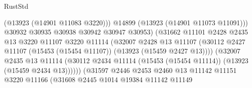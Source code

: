 \begin{lexlean}{RustStd}
\begin{coremodule}
                                              (@13923 (@14901 @11083 @3220)))
                                            @14899
                                            (@13923 (@14901 @11073 @11091)))
                                          @30932
                                          @30935
                                          @30938
                                          @30942
                                          @30947
                                          @30953)
                                        (@31662
                                          @11101
                                          @2428
                                          @2435
                                          @13
                                          @3220
                                          @11107
                                          @3220
                                          @11114
                                          (@32007
                                            @2428
                                            @13
                                            @11107
                                            (@30112
                                              @2427
                                              @11107
                                              (@15453 (@15454 @11107))
                                              (@13923 (@15459 @2427 @13))))
                                          (@32007
                                            @2435
                                            @13
                                            @11114
                                            (@30112
                                              @2434
                                              @11114
                                              (@15453 (@15454 @11114))
                                              (@13923 (@15459 @2434 @13))))))
                                      (@31597
                                        @2446
                                        @2453
                                        @2460
                                        @13
                                        @11142
                                        @11151
                                        @3220
                                        @11166
                                        (@31608
                                          @2445
                                          @1014
                                          @19384
                                          @11142
                                          @11149

\end{coremodule}
\end{lexlean}
